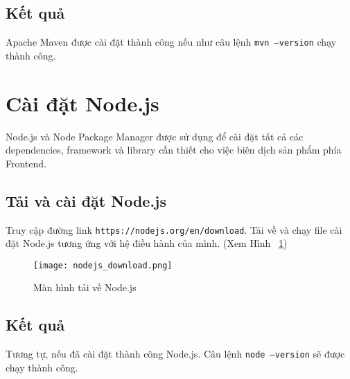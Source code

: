     \subsection{Kết quả}
        Apache Maven được cài đặt thành công nếu như câu lệnh \texttt{mvn --version} chạy thành công.
    
\section{Cài đặt Node.js}
Node.js và Node Package Manager được sử dụng để cài đặt tất cả các dependencies, framework và library cần thiết cho việc biên dịch sản phẩm phía Frontend.

\subsection{Tải và cài đặt Node.js}
Truy cập đường link \texttt{https://nodejs.org/en/download}. Tải về và chạy file cài đặt Node.js tương ứng với hệ điều hành của mình.
(Xem Hình ~\ref{fig:node.js_download})

\begin{figure}
    \centering
    \texttt{[image: nodejs\_download.png]}
    \caption{Màn hình tải về Node.js}
    \label{fig:node.js_download}
\end{figure}

\subsection{Kết quả}
Tương tự, nếu đã cài đặt thành công Node.js. Câu lệnh \texttt{node --version} sẽ được chạy thành công.
